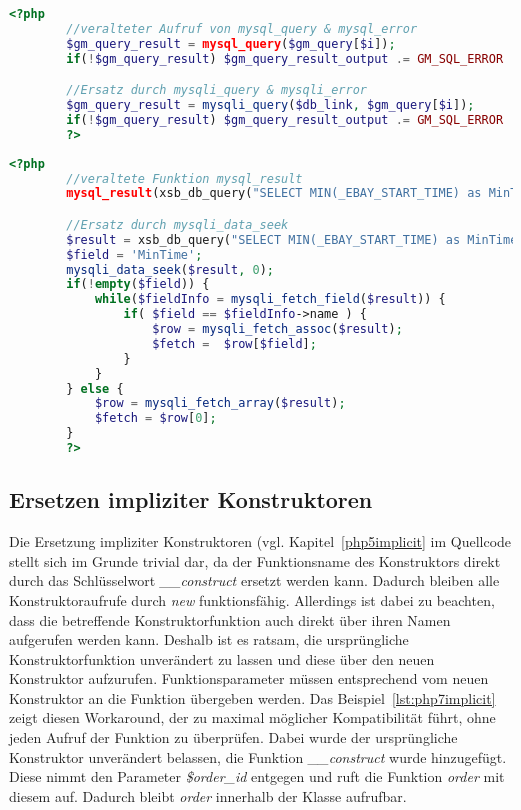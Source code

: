     \begin{lstlisting}[language=php, caption={Beispiel der Ersetzung von \textit{mysql} durch \textit{mysqli}}, label={lst:php7mysqlilow}]
        <?php
        //veralteter Aufruf von mysql_query & mysql_error
        $gm_query_result = mysql_query($gm_query[$i]);
        if(!$gm_query_result) $gm_query_result_output .= GM_SQL_ERROR . mysql_error() . '<br />';

        //Ersatz durch mysqli_query & mysqli_error
        $gm_query_result = mysqli_query($db_link, $gm_query[$i]);
		if(!$gm_query_result) $gm_query_result_output .= GM_SQL_ERROR . mysqli_error($db_link) . '<br />';
        ?>
    \end{lstlisting}

    \begin{lstlisting}[language=php, caption={Beispiel der Ersetzung von \textit{mysql\_result} durch \textit{mysqli}}, label={lst:php7mysqlihard}]
        <?php
        //veraltete Funktion mysql_result
        mysql_result(xsb_db_query("SELECT MIN(_EBAY_START_TIME) as MinTime FROM xtb_auctions"),0,'MinTime');

        //Ersatz durch mysqli_data_seek
        $result = xsb_db_query("SELECT MIN(_EBAY_START_TIME) as MinTime FROM xtb_auctions");
        $field = 'MinTime';
        mysqli_data_seek($result, 0);
        if(!empty($field)) {
            while($fieldInfo = mysqli_fetch_field($result)) {
                if( $field == $fieldInfo->name ) {
                    $row = mysqli_fetch_assoc($result);
                    $fetch =  $row[$field];
                }
            }
        } else {
            $row = mysqli_fetch_array($result);
            $fetch = $row[0];
        }
        ?>
    \end{lstlisting}

    \subsection{Ersetzen impliziter Konstruktoren}\label{construct}
    Die Ersetzung impliziter Konstruktoren (vgl. Kapitel~\ref{php5implicit} im Quellcode stellt sich im Grunde trivial dar, da der 
    Funktionsname des Konstruktors direkt durch das Schlüsselwort \textit{\_\_construct} ersetzt werden kann. 
    Dadurch bleiben alle Konstruktoraufrufe durch \textit{new} funktionsfähig. Allerdings 
    ist dabei zu beachten, dass die betreffende Konstruktorfunktion auch direkt über ihren Namen aufgerufen werden kann.
    Deshalb ist es ratsam, die ursprüngliche Konstruktorfunktion unverändert zu lassen und diese über den neuen 
    Konstruktor aufzurufen. Funktionsparameter müssen entsprechend vom neuen Konstruktor an die Funktion übergeben werden. 
    Das Beispiel~\ref{lst:php7implicit} zeigt diesen Workaround, der zu maximal möglicher Kompatibilität führt, 
    ohne jeden Aufruf der Funktion zu überprüfen. Dabei 
    wurde der ursprüngliche Konstruktor unverändert belassen, die Funktion \textit{\_\_construct} wurde hinzugefügt. Diese 
    nimmt den Parameter \textit{\$order\_id} entgegen und ruft die Funktion \textit{order} mit diesem auf. Dadurch 
    bleibt \textit{order} innerhalb der Klasse aufrufbar.

